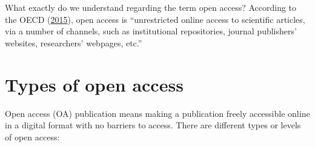 \documentclass[
]{book}
\begin{document}
What exactly do we understand regarding the term open access? According to the OECD (\href{https://www.oecd-ilibrary.org/science-and-technology/making-open-science-a-reality_5jrs2f963zs1-en}{2015}), open access is ``unrestricted online access to scientific articles, via a number of channels, such as institutional repositories, journal publishers' websites, researchers' webpages, etc.''

\hypertarget{types-of-open-access}{%
\section{Types of open access}\label{types-of-open-access}}

Open access (OA) publication means making a publication freely accessible online in a digital format with no barriers to access. There are different types or levels of open access:
\end{document}
